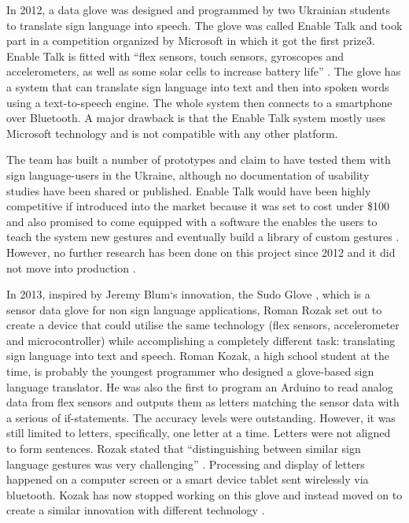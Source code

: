 In 2012, a data glove was designed and programmed by two Ukrainian students to translate sign language into speech. The glove was called Enable Talk and took part in a competition organized by Microsoft in which it got the first prize3. Enable Talk is fitted with ``flex sensors, touch sensors, gyroscopes and accelerometers, as well as some solar cells to increase battery life'' \parencite{EnableTalk}. The glove has a system that can translate sign language into text and then into spoken words using a text-to-speech engine. The whole system then connects to a smartphone over Bluetooth\texttrademark \parencite{EnableTalk}. A major drawback is that the Enable Talk system mostly uses Microsoft technology and is not compatible with any other platform.

The team has built a number of prototypes and claim to have tested them with sign language-users in the Ukraine, although no documentation of usability studies have been shared or published. Enable Talk would have been highly competitive if introduced into the market because it was set to cost under \$100 and also promised to come equipped with a software the enables the users to teach the system new gestures and eventually build a library of custom gestures \parencite{EnableTalk}. However, no further research has been done on this project since 2012 and it did not move into production \parencite{EnableTalk}. 

In 2013, inspired by Jeremy Blum‘s innovation, the Sudo Glove \parencite{Blum2012}, which is a sensor data glove for non sign language applications, Roman Rozak set out to create a device that could utilise the same technology (flex sensors, accelerometer and microcontroller) while accomplishing a completely different task: translating sign language into text and speech. Roman Kozak, a high school student at the time, is probably the youngest programmer who designed a glove-based sign language translator. He was also the first to program an Arduino to read analog data from flex sensors and outputs them as letters matching the sensor data with a serious of if-statements. The accuracy levels were outstanding. However, it was still limited to letters, specifically, one letter at a time. Letters were not aligned to form sentences. Rozak stated that ``distinguishing between similar sign language gestures was very challenging'' \parencite{Rozak}. Processing and display of letters happened on a computer screen or a smart device tablet sent wirelessly via bluetooth. Kozak has now stopped working on this glove and instead moved on to create a similar innovation with different technology \parencite{Rozak}.

